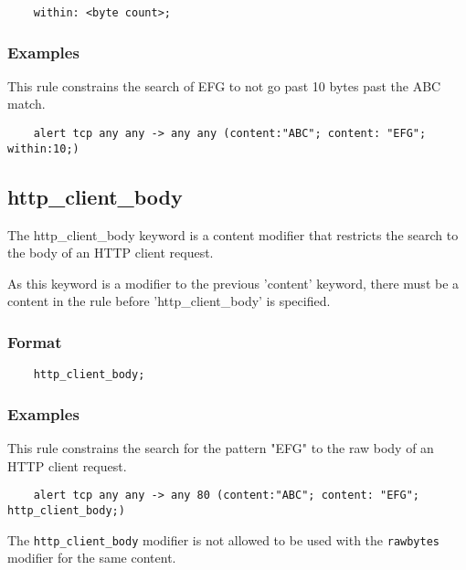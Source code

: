 \documentclass[english]{report}
\newenvironment{note}{
\samepage
    \vspace{10pt}{\textsf{
        {\hspace{7pt}\Huge{$\triangle$\hspace{-12.5pt}{\Large{$^!$}}}}\hspace{5pt}
        {\Large{NOTE}}
    }
    }
   \begin{center}
    \par\vspace{-17pt}

    \begin{lrbox}{\savepar}
    \begin{minipage}[r]{6in}
}
{
    \end{minipage}
    \end{lrbox}
    \fbox{
        \usebox{
            \savepar
	}
    }
    \par\vskip10pt
    \end{center}
}
\newenvironment{note}{
        \begin{rawhtml}
        <p><table border="1"><tr><td><b>
        Note:&nbsp;&nbsp;</b>
        \end{rawhtml}
}{
        \begin{rawhtml}
        </b></td></tr></table></p>
        \end{rawhtml}
}
\begin{document}
\begin{verbatim}
    within: <byte count>;
\end{verbatim}

\subsubsection{Examples}

This rule constrains the search of EFG to not go past 10 bytes past the ABC match. 

\begin{verbatim}
    alert tcp any any -> any any (content:"ABC"; content: "EFG"; within:10;)
\end{verbatim}

\subsection{http\_client\_body}
\label{sub:HttpClientBody}

The http\_client\_body keyword is a content modifier that restricts the search
to the body of an HTTP client request.

As this keyword is a modifier to the previous 'content' keyword, there must be
a content in the rule before 'http\_client\_body' is specified.

\subsubsection{Format}

\begin{verbatim}
    http_client_body;
\end{verbatim}

\subsubsection{Examples}

This rule constrains the search for the pattern "EFG" to the raw body of
an HTTP client request.

\begin{verbatim}
    alert tcp any any -> any 80 (content:"ABC"; content: "EFG"; http_client_body;)
\end{verbatim}

\begin{note}
The \texttt{http\_client\_body} modifier is not allowed to be used with
the \texttt{rawbytes} modifier for the same content.
\end{note}
\end{document}

